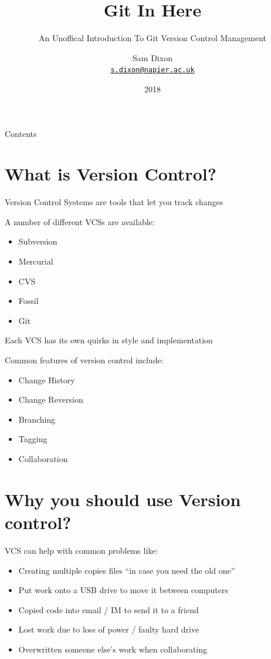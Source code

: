 \documentclass{beamer}
\title{Git In Here}
\subtitle{An Unoffical Introduction To Git Version Control Management}
\author{Sam Dixon\\
{\tt \href{mailto:s.dixon@napier.ac.uk}{s.dixon@napier.ac.uk}}}
\date{2018}
\begin{document}
\frame{\titlepage}


\begin{frame}{Contents}
    \tableofcontents
\end{frame}


\section{What is Version Control?}
\begin{frame}[allowframebreaks]{\secname}
    Version Control Systems are tools that let you track changes    
    
    A number of different VCSs are available:
    \begin{itemize}
    \item Subversion
    \item Mercurial
    \item CVS
    \item Fossil
    \item Git
    \end{itemize}
    Each VCS has its own quirks in style and implementation 

\framebreak

    Common features of version control include:
    \begin{itemize}
    \item Change History
    \item Change Reversion  
    \item Branching
    \item Tagging
    \item Collaboration
    \end{itemize}
\end{frame}


\section{Why you should use Version control?}
\begin{frame}{\secname}
    VCS can help with common problems like:

    \begin{itemize}
    \item Creating multiple copies files ``in case you need the old one''
    \item Put work onto a USB drive to move it between computers
    \item Copied code into email / IM to send it to a friend
    \item Lost work due to loss of power / faulty hard drive
    \item Overwritten someone else's work when collaborating
    \end{itemize}
\end{frame}
\end{document}

